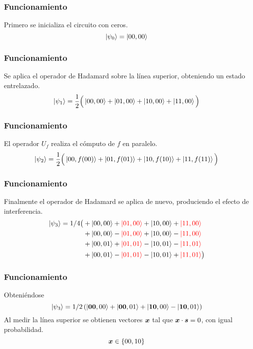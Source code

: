\begin{frame}
\frametitle{Funcionamiento}

Primero se inicializa el circuito con ceros.
$$ \ket{\psi_0} = \ket{00,00} $$
\end{frame}
\begin{frame}
\frametitle{Funcionamiento}

Se aplica el operador de Hadamard sobre la línea superior, obteniendo un estado 
entrelazado.
$$
\ket{\psi_1} = \frac{1}{2} \Big(\ket{00,00} + \ket{01,00} + \ket{10,00} + 
\ket{11,00} \Big)
$$
\end{frame}
\begin{frame}
\frametitle{Funcionamiento}

El operador $U_f$ realiza el cómputo de $f$ en paralelo.
$$
	\ket{\psi_2} = \frac{1}{2} \Big(\ket{00,f(00)} + \ket{01,f(01)} + 
\ket{10,f(10)} + \ket{11,f(11)}\Big)
$$
\end{frame}
\begin{frame}
\frametitle{Funcionamiento}

Finalmente el operador de Hadamard se aplica de nuevo, produciendo el efecto de 
interferencia.
\begin{equation*}
\begin{split}
\ket{\psi_3} = 1/4 \big( &
		+ \ket{00,00} + {\color{red} {\ket{01,00}}}+ \ket{10,00} + {\color{red} {\ket{11,00}}}\\
	& + \ket{00,00} - {\color{red} {\ket{01,00}}}+ \ket{10,00} - {\color{red} {\ket{11,00}}}\\
	& + \ket{00,01} + {\color{red} {\ket{01,01}}}- \ket{10,01} - {\color{red} {\ket{11,01}}}\\
	& + \ket{00,01} - {\color{red} {\ket{01,01}}}- \ket{10,01} + {\color{red} {\ket{11,01}}}
	\big)
\end{split}
\end{equation*}
\end{frame}
\begin{frame}
\frametitle{Funcionamiento}

Obteniéndose
\begin{equation*}
	\ket{\psi_3} = 1/2 \left( \ket{\mathbf{00},00} + \ket{\mathbf{00},01} + 
\ket{\mathbf{10},00} - \ket{\mathbf{10},01} \right)
\end{equation*}
Al medir la línea superior se obtienen vectores $\boldsymbol{x}$ tal que $\boldsymbol{x} \cdot \boldsymbol{s} 
= 0$, con igual probabilidad.
$$ \boldsymbol{x} \in \{00, 10\} $$
\end{frame}
